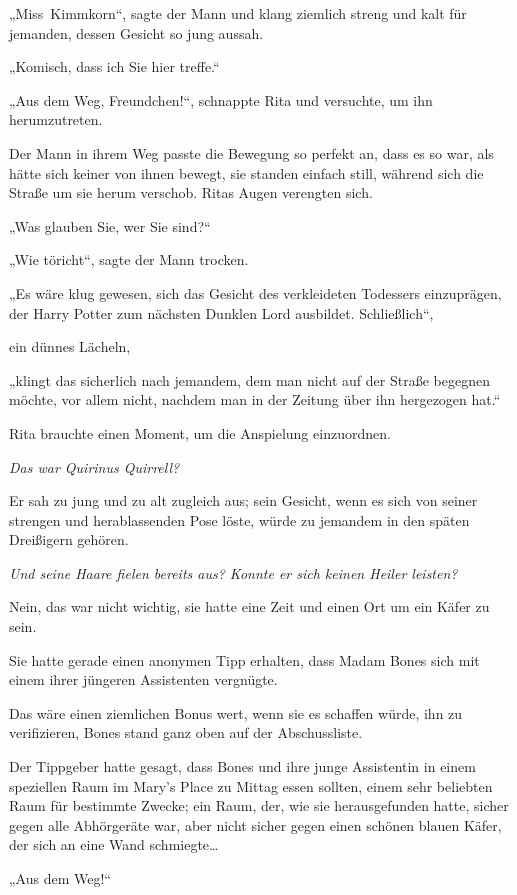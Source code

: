 {„Miss~Kimmkorn“, sagte der Mann und klang ziemlich streng und kalt für jemanden, dessen Gesicht so jung aussah.

„Komisch, dass ich Sie hier treffe.“

„Aus dem Weg, Freundchen!“, schnappte Rita und versuchte, um ihn herumzutreten.

Der Mann in ihrem Weg passte die Bewegung so perfekt an, dass es so war, als hätte sich keiner von ihnen bewegt, sie standen einfach still, während sich die Straße um sie herum verschob. Ritas Augen verengten sich.

„Was glauben Sie, wer Sie sind?“

„Wie töricht“, sagte der Mann trocken.

„Es wäre klug gewesen, sich das Gesicht des verkleideten Todessers einzuprägen, der Harry Potter zum nächsten Dunklen Lord ausbildet. Schließlich“,

ein dünnes Lächeln,

„klingt das sicherlich nach jemandem, dem man nicht auf der Straße begegnen möchte, vor allem nicht, nachdem man in der Zeitung über ihn hergezogen hat.“

Rita brauchte einen Moment, um die Anspielung einzuordnen.

\emph{Das war Quirinus Quirrell?}

Er sah zu jung und zu alt zugleich aus; sein Gesicht, wenn es sich von seiner strengen und herablassenden Pose löste, würde zu jemandem in den späten Dreißigern gehören.

\emph{Und seine Haare fielen bereits aus? Konnte er sich keinen Heiler leisten?}

Nein, das war nicht wichtig, sie hatte eine Zeit und einen Ort um ein Käfer zu sein.

Sie hatte gerade einen anonymen Tipp erhalten, dass Madam Bones sich mit einem ihrer jüngeren Assistenten vergnügte.

Das wäre einen ziemlichen Bonus wert, wenn sie es schaffen würde, ihn zu verifizieren, Bones stand ganz oben auf der Abschussliste.

Der Tippgeber hatte gesagt, dass Bones und ihre junge Assistentin in einem speziellen Raum im Mary's Place zu Mittag essen sollten, einem sehr beliebten Raum für bestimmte Zwecke; ein Raum, der, wie sie herausgefunden hatte, sicher gegen alle Abhörgeräte war, aber nicht sicher gegen einen schönen blauen Käfer, der sich an eine Wand schmiegte…

„Aus dem Weg!“

}
